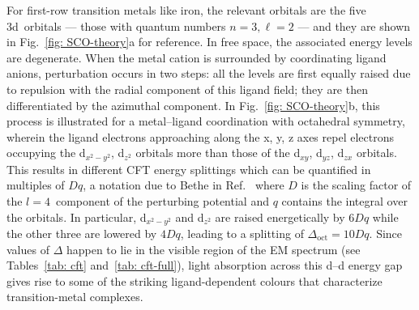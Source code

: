 For first-row transition metals like iron,
the relevant orbitals are the five 3d~orbitals --- those with quantum numbers $n = 3, \ell = 2$ ---
and they are shown in Fig.~\ref{fig: SCO-theory}a for reference.
%
In free space, the associated energy levels are degenerate.
When the metal cation is surrounded by coordinating ligand anions, perturbation occurs in two steps:
all the levels are first equally raised due to repulsion with the radial component of this ligand field;
they are then differentiated by the azimuthal component.
%
In Fig.~\ref{fig: SCO-theory}b, this process is illustrated for
a metal--ligand coordination with octahedral symmetry,
wherein the ligand electrons approaching along the x, y, z axes repel
electrons occupying the d$_{x^2 - y^2}$, d$_{z^2}$ orbitals more than
those of the d$_{xy}$, d$_{yz}$, d$_{zx}$ orbitals.
%
This results in different CFT energy splittings
which can be quantified in multiples of $Dq$,
a notation due to Bethe in Ref.~\cite{Bethe1929}
where $D$ is the scaling factor of the $l = 4$~component of the perturbing potential
and $q$ contains the integral over the orbitals.
%
In particular, d$_{x^2 - y^2}$ and d$_{z^2}$ are raised energetically by $6Dq$
while the other three are lowered by $4Dq$,
leading to a splitting of $\Delta_\text{oct} = 10Dq$.
%
Since values of $\Delta$ happen to lie in the visible region of the EM spectrum
(see Tables~\ref{tab: cft} and~\ref{tab: cft-full}),
light absorption across this d--d energy gap gives rise to
some of the striking ligand-dependent colours
that characterize transition-metal complexes.

